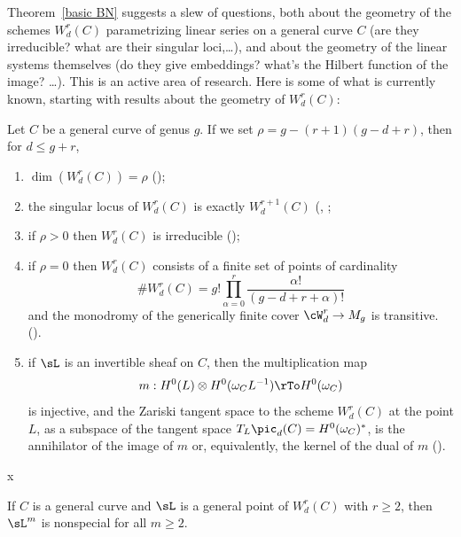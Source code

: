 Theorem~\ref{basic BN} suggests a slew of questions, both about the geometry of the schemes $W^r_d(C)$ parametrizing linear series on a general curve $C$ (are they irreducible? what are their singular loci,\dots), and about the geometry of the linear systems themselves (do they give embeddings? what's the Hilbert function of the image? \dots). This is an active area of research. Here is some of what is currently known, starting with results about the geometry of $W^r_d(C)$:

\begin{theorem}\label{Wrd omnibus}
Let $C$ be a general curve of genus $g$. If we set $\rho = g - (r+1)(g-d+r)$, then for $d \leq g+r$,
\begin{enumerate}

\item $\dim(W^r_d(C)) = \rho$ (\cite{Griffiths-Harris-BN});\label{GH}

\item\label{sing wrd} the singular locus of $W^r_d(C)$ is exactly $W^{r+1}_d(C)$
(\cite{Gieseker-Petri}, \cite{Lazarsfeld-Petri};
\label{irr wrd} 

\item if $\rho > 0$ then $W^r_d(C)$ is irreducible (\cite{MR611386});

\item\label{rho=0} if $\rho = 0$ then $W^r_d(C)$ consists of a finite set of  points of cardinality
$$
\#W^r_d(C) = g! \prod_{\alpha=0}^r \frac{\alpha!}{(g-d+r+\alpha)!}
$$
and the monodromy of the generically finite cover $\cW^r_d \to M_g$ is transitive.
(\cite{zbMATH04014883}).

\item\label{Petri} if  $\sL$ is an invertible sheaf on $C$, then the multiplication map
$$
m : H^0(L) \otimes H^0(\omega_CL^{-1}) \rTo H^0(\omega_C)
$$
is injective, and the Zariski tangent space to the scheme $W^r_d(C)$ at the point $L$, as a subspace
of the tangent space $T_L\pic_d(C) = H^0(\omega_C)^*$, is the annihilator of the image of $m$
or, equivalently, the kernel of the dual of $m$ (\cite{Gieseker-Petri}).
\end{enumerate}
\end{theorem}

x\begin{corollary}\label{2L nonspecial}
If $C$ is a general curve and $\sL$ is a general point of $W^r_d(C)$ with $r\geq 2$,
 then $\sL^m$ is nonspecial for all $m \geq 2$.
\end{corollary}

